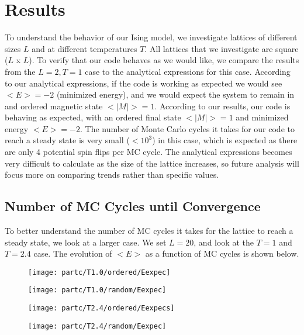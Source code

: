 \documentclass[a4paper]{article}
\begin{document}
\section{Results}\label{results}
To understand the behavior of our Ising model, we investigate lattices of different sizes $L$ and at different temperatures $T$. All lattices that we investigate are square ($L$ x $L$). To verify that our code behaves as we would like, we compare the results from the $L=2, T=1$ case to the analytical expressions for this case. According to our analytical expressions, if the code is working as expected we would see $<E> = -2$ (minimized energy), and we would expect the system to remain in and ordered magnetic state $<|M|>=1$. According to our results, our code is behaving as expected, with an ordered final state $<|M|> = 1$ and minimized energy $<E> = -2$. The number of Monte Carlo cycles it takes for our code to reach a steady state is very small ($<10^3$) in this case, which is expected as there are only 4 potential spin flips per MC cycle. The analytical expressions becomes very difficult to calculate as the size of the lattice increases, so future analysis will focus more on comparing trends rather than specific values.

\subsection{Number of MC Cycles until Convergence}

To better understand the number of MC cycles it takes for the lattice to reach a steady state, we look at a larger case. We set $L=20$, and look at the $T=1$ and $T=2.4$ case. The evolution of $<E>$ as a function of MC cycles is shown below.

\begin{figure}[ht!]
\centering
\begin{minipage}[t]{0.45\textwidth}
\centering
\texttt{[image: partc/T1.0/ordered/Eexpec]}
\label{fig:mesh1}
\end{minipage}
\begin{minipage}[t]{0.45\textwidth}
\centering
\texttt{[image: partc/T1.0/random/Eexpec]}
\label{fig:mesh2}
\end{minipage}
\end{figure}

\begin{figure}[ht!]
\centering
\begin{minipage}[t]{0.45\textwidth}
\centering
\texttt{[image: partc/T2.4/ordered/Eexpecs]}
\label{fig:mesh3}
\end{minipage}
\begin{minipage}[t]{0.45\textwidth}
\centering
\texttt{[image: partc/T2.4/random/Eexpec]}
\label{fig:mesh4}
\end{minipage}
\end{figure}
\end{document}
